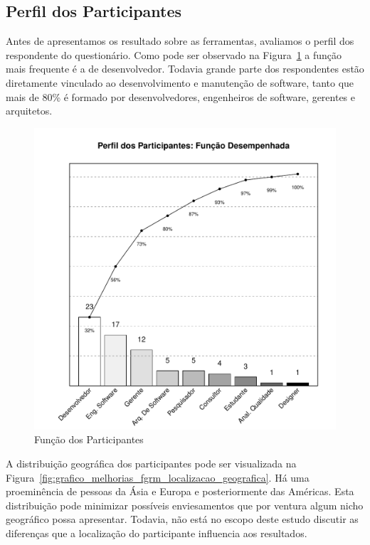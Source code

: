 \subsection{Perfil dos Participantes}
\label{sub:pesquisa_prof_perfil_dos_participantes}

Antes de apresentamos os resultado sobre as ferramentas, avaliamos o perfil dos
respondente do questionário. Como pode ser observado na
Figura~\ref{fig:grafico_melhorias_fgrm_funcao_particantes} a função mais
frequente é a de desenvolvedor. Todavia grande parte dos respondentes estão
diretamente vinculado ao desenvolvimento e manutenção de software, tanto que
mais de 80\% é formado por desenvolvedores, engenheiros de software, gerentes e
arquitetos. 

\begin{figure}[htpb]
	\centering
	\includegraphics[width=0.8\linewidth]{./chapter-pesquisa-com-profissionais/img/grafico_melhoria_fgrm_funcao_participantes.pdf}
	\caption{Função dos Participantes}
\label{fig:grafico_melhorias_fgrm_funcao_particantes}
\end{figure}

A distribuição geográfica dos participantes pode ser visualizada na
Figura~\ref{fig:grafico_melhorias_fgrm_localizacao_geografica}. Há uma
proeminência de pessoas da Ásia e Europa e posteriormente das Américas. Esta
distribuição pode minimizar possíveis enviesamentos que por ventura algum nicho
geográfico possa apresentar. Todavia, não está no escopo deste estudo discutir
as diferenças que a localização do participante influencia aos resultados. 

